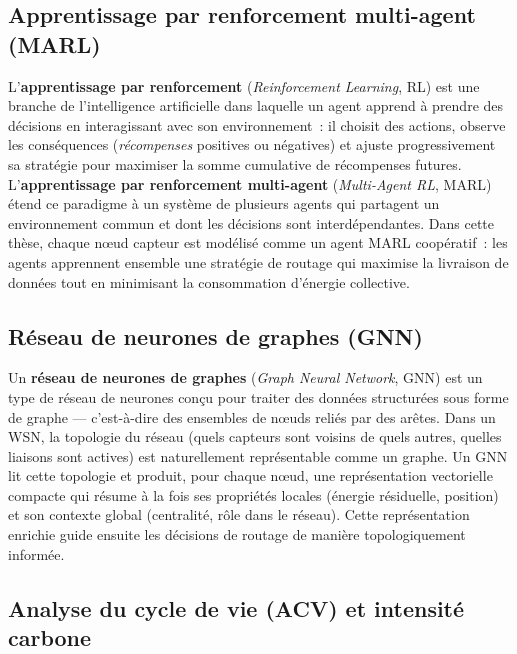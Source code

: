 \subsection*{Apprentissage par renforcement multi-agent (MARL)}

L'\textbf{apprentissage par renforcement} (\emph{Reinforcement Learning}, RL) est une branche de l'intelligence artificielle dans laquelle un agent apprend à prendre des décisions en interagissant avec son environnement~: il choisit des actions, observe les conséquences (\emph{récompenses} positives ou négatives) et ajuste progressivement sa stratégie pour maximiser la somme cumulative de récompenses futures. L'\textbf{apprentissage par renforcement multi-agent} (\emph{Multi-Agent RL}, MARL) étend ce paradigme à un système de plusieurs agents qui partagent un environnement commun et dont les décisions sont interdépendantes. Dans cette thèse, chaque nœud capteur est modélisé comme un agent MARL coopératif~: les agents apprennent ensemble une stratégie de routage qui maximise la livraison de données tout en minimisant la consommation d'énergie collective.

\subsection*{Réseau de neurones de graphes (GNN)}

Un \textbf{réseau de neurones de graphes} (\emph{Graph Neural Network}, GNN) est un type de réseau de neurones conçu pour traiter des données structurées sous forme de graphe --- c'est-à-dire des ensembles de nœuds reliés par des arêtes. Dans un WSN, la topologie du réseau (quels capteurs sont voisins de quels autres, quelles liaisons sont actives) est naturellement représentable comme un graphe. Un GNN lit cette topologie et produit, pour chaque nœud, une représentation vectorielle compacte qui résume à la fois ses propriétés locales (énergie résiduelle, position) et son contexte global (centralité, rôle dans le réseau). Cette représentation enrichie guide ensuite les décisions de routage de manière topologiquement informée.

\subsection*{Analyse du cycle de vie (ACV) et intensité carbone}

